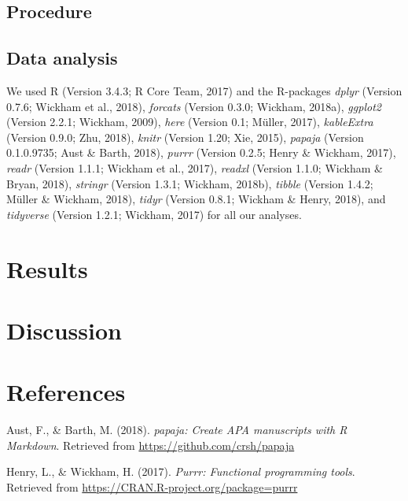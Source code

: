 \documentclass[,man]{apa6}
\begin{document}
\hypertarget{procedure}{%
\subsection{Procedure}\label{procedure}}

\hypertarget{data-analysis}{%
\subsection{Data analysis}\label{data-analysis}}

We used R (Version 3.4.3; R Core Team, 2017) and the R-packages
\emph{dplyr} (Version 0.7.6; Wickham et al., 2018), \emph{forcats}
(Version 0.3.0; Wickham, 2018a), \emph{ggplot2} (Version 2.2.1; Wickham,
2009), \emph{here} (Version 0.1; Müller, 2017), \emph{kableExtra}
(Version 0.9.0; Zhu, 2018), \emph{knitr} (Version 1.20; Xie, 2015),
\emph{papaja} (Version 0.1.0.9735; Aust \& Barth, 2018), \emph{purrr}
(Version 0.2.5; Henry \& Wickham, 2017), \emph{readr} (Version 1.1.1;
Wickham et al., 2017), \emph{readxl} (Version 1.1.0; Wickham \& Bryan,
2018), \emph{stringr} (Version 1.3.1; Wickham, 2018b), \emph{tibble}
(Version 1.4.2; Müller \& Wickham, 2018), \emph{tidyr} (Version 0.8.1;
Wickham \& Henry, 2018), and \emph{tidyverse} (Version 1.2.1; Wickham,
2017) for all our analyses.

\hypertarget{results}{%
\section{Results}\label{results}}

\hypertarget{discussion}{%
\section{Discussion}\label{discussion}}

\newpage

\hypertarget{references}{%
\section{References}\label{references}}

\begingroup
\setlength{\parindent}{-0.5in}
\setlength{\leftskip}{0.5in}

\hypertarget{refs}{}
\leavevmode\hypertarget{ref-R-papaja}{}%
Aust, F., \& Barth, M. (2018). \emph{papaja: Create APA manuscripts with
R Markdown}. Retrieved from \url{https://github.com/crsh/papaja}

\leavevmode\hypertarget{ref-R-purrr}{}%
Henry, L., \& Wickham, H. (2017). \emph{Purrr: Functional programming
tools}. Retrieved from \url{https://CRAN.R-project.org/package=purrr}
\end{document}
